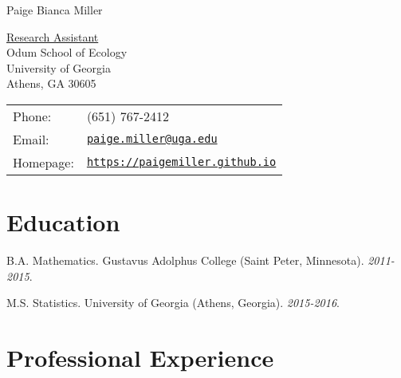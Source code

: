 \documentclass[letterpaper]{article}
\def\name{Paige Bianca Miller}
\renewenvironment{itemize}{
  \begin{list}{}{
    \setlength{\leftmargin}{1.5em}
  }
}{
  \end{list}
}
\begin{document}
{\huge \name}


\vspace{0.25in}

\begin{minipage}{0.45\linewidth}
  \href{}{Research Assistant} \\
  Odum School of Ecology \\
  University of Georgia \\
  Athens, GA 30605
\end{minipage}
\begin{minipage}{0.45\linewidth}
  \begin{tabular}{ll}
    Phone: & (651) 767-2412 \\
    Email: & \href{mailto:paige.miller@uga.edu}{\tt paige.miller@uga.edu} \\
    Homepage: & \href{https://paigemiller.github.io}{\tt https://paigemiller.github.io} \\
  \end{tabular}
\end{minipage}

\section*{Education}

\begin{itemize}
  \item B.A. Mathematics. Gustavus Adolphus College (Saint Peter, Minnesota). \textit{2011-2015}.
  \item M.S. Statistics. University of Georgia (Athens, Georgia). \textit{2015-2016}.
\end{itemize}

\section*{Professional Experience}
\end{document}
